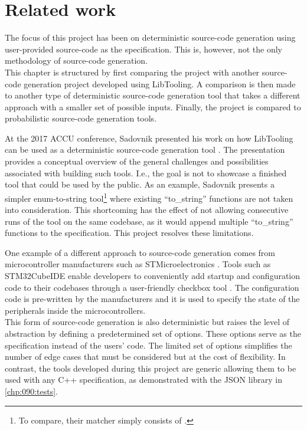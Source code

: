 \chapter{Related work}

The focus of this project has been on deterministic source-code generation using user-provided source-code as the specification. This is, however, not the only methodology of source-code generation.\\
This chapter is structured by first comparing the project with another source-code generation project developed using LibTooling.
A comparison is then made to another type of deterministic source-code generation tool that takes a different approach with a smaller set of possible inputs.
Finally, the project is compared to probabilistic source-code generation tools.

At the 2017 ACCU conference, Sadovnik presented his work on how LibTooling can be used as a deterministic source-code generation tool \cite{sadovnikovUsingClangSource}.
The presentation provides a conceptual overview of the general challenges and possibilities associated with building such tools. I.e., the goal is not to showcase a finished tool that could be used by the public.
As an example, Sadovnik presents a simpler enum-to-string tool\footnote{
    To compare, their matcher simply consists of .
} where existing ``to\_string'' functions are not taken into consideration.
This shortcoming has the effect of not allowing consecutive runs of the tool on the same codebase, as it would append multiple ``to\_string'' functions to the specification.
This project resolves these limitations.

One example of a different approach to source-code generation comes from microcontroller manufacturers such as STMicroelectronics \cite{stmSTMicroelectronicsOurTechnology}.
Tools such as STM32CubeIDE enable developers to conveniently add startup and configuration code to their codebases through a user-friendly checkbox tool \cite{stmSTM32CubeDevelopmentSoftware}.
The configuration code is pre-written by the manufacturers and it is used to specify the state of the peripherals inside the microcontrollers.\\
This form of source-code generation is also deterministic but raises the level of abstraction by defining a predetermined set of options. These options serve as the specification instead of the users' code.
The limited set of options simplifies the number of edge cases that must be considered but at the cost of flexibility.
In contrast, the tools developed during this project are generic allowing them to be used with any C++ specification, as demonstrated with the JSON library \cite{lohmannJSONModern2022} in \cref{chp:090:tests}.

